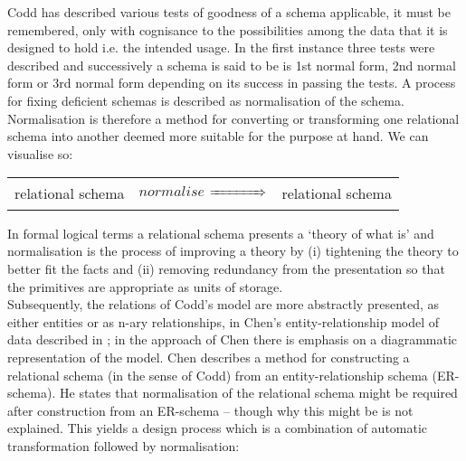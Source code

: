 \documentclass[10pt,a4paper]{article}
\begin{document}
\noindent Codd has described various tests of goodness of a schema applicable, it must be remembered, only with cognisance to the possibilities among the data that it is designed to hold i.e. the intended usage.
In the first instance three tests were described and successively a schema is said to be is 1st normal form, 2nd normal form or 3rd normal form depending on its success in passing the tests. A process for 
fixing deficient schemas is described as normalisation of the schema. Normalisation is therefore
a method for converting or transforming one relational schema into another deemed more suitable for the purpose 
at hand. We can visualise so:
\begin{center}
\begin{tabular}{ p{1.25cm} p{1.25cm}  p{1.25cm}}
relational schema & \parbox[c]{1.25cm}{$normalise$ $\xRightarrow{\hspace*{1.3cm}}$} & relational schema
\end{tabular}
\end{center}

\noindent In formal logical terms a relational schema presents a `theory of what is' and normalisation is the process of improving a theory by (i) tightening the theory to better fit the facts and (ii) removing redundancy from the presentation so that the primitives are appropriate as units of storage.\\


\noindent Subsequently, the relations of Codd's model are more abstractly presented, as either entities or as n-ary relationships, in Chen's entity-relationship model of data described in \cite{Chen1976} ;
in the approach of Chen there is emphasis on a diagrammatic representation of the model. 
Chen describes a method for constructing 
a relational schema (in the sense of Codd) from an entity-relationship schema (ER-schema).
He states that normalisation of the relational schema might be required after construction from an ER-schema -- though why this might be is not explained. 
This yields a design process which is a combination of automatic transformation followed by 
normalisation: 
\end{document}
